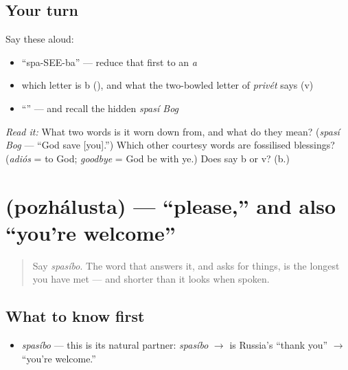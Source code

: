 \subsection*{Your turn}
Say these aloud:

\begin{itemize}
\raggedright
  \item \textquotedblleft{}spa-SEE-ba\textquotedblright{} — reduce that first  to an \emph{a}
  \item which letter is b (), and what the two-bowled letter of \emph{privét} says (v)
  \item \textquotedblleft{}\textquotedblright{} — and recall the hidden \emph{spasí Bog}
\end{itemize}

\begin{tcolorbox}[breakable,colback=teal!4,colframe=teal!35!black,title={Before you move on}]
\emph{Read it:} \textbf{} What two words is it worn down from, and what do they mean? (\emph{spasí Bog} — \textquotedblleft{}God save {[}you{]}.\textquotedblright{}) Which other courtesy words are fossilised blessings? (\emph{adiós} = to God; \emph{goodbye} = God be with ye.) Does  say b or v? (b.)
\end{tcolorbox}
\section[\texorpdfstring{\ru{пожалуйста} (pozhálusta)}{пожалуйста (pozhálusta)}]{ (pozhálusta) — \textquotedblleft{}please,\textquotedblright{} and also \textquotedblleft{}you're welcome\textquotedblright{}}

\label{lesson:RU-C01-pozhaluysta}



\begin{quote}
Say \emph{spasíbo}. The word that answers it, and asks for things, is the longest you have met — and shorter than it looks when spoken.
\end{quote}

\subsection*{What to know first}
\begin{itemize}
\raggedright
  \item \emph{spasíbo} — this is its natural partner: \emph{spasíbo} $\to$ \emph{} is Russia's \textquotedblleft{}thank you\textquotedblright{} $\to$ \textquotedblleft{}you're welcome.\textquotedblright{}
\end{itemize}

